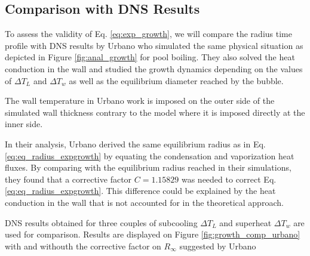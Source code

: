 \subsection{Comparison with DNS Results}

To assess the validity of Eq. \ref{eq:exp_growth}, we will compare the radius time profile with DNS results by Urbano \etal \cite{urbano_direct_2019} who simulated the same physical situation as depicted in Figure \ref{fig:anal_growth} for pool boiling. They also solved the heat conduction in the wall and studied the growth dynamics depending on the values of $\Delta T_{L}$ and $\Delta T_{w}$ as well as the equilibrium diameter reached by the bubble. 

\begin{note*}{}
The wall temperature in Urbano \etal work is imposed on the outer side of the simulated wall thickness contrary to the model where it is imposed directly at the inner side.
\end{note*}

\npar

In their analysis, Urbano \etal derived the same equilibrium radius as in Eq. \ref{eq:eq_radius_expgrowth} by equating the condensation and vaporization heat fluxes. By comparing with the equilibrium radius reached in their simulations, they found that a corrective factor $C=1.15829$ was needed to correct Eq. \ref{eq:eq_radius_expgrowth}. This difference could be explained by the heat conduction in the wall that is not accounted for in the theoretical approach.

\npar

DNS results obtained for three couples of subcooling $\Delta T_{L}$ and superheat $\Delta T_{w}$ are used for comparison. Results are displayed on Figure \ref{fig:growth_comp_urbano} with and withouth the corrective factor on $R_{\infty}$ suggested by Urbano \etal

